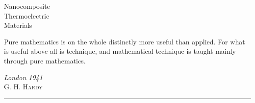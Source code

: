 \usepackage{tikz}	
\usepackage{epigraph}

\renewcommand\epigraphflush{flushright}

\makeatletter                       
\def\printauthor{%
    {\large \@author}}              
\makeatother
\author{
    Callum Vincent \\
    MPhys Student \\
    \texttt{cv235@exeter.ac.uk}\vspace{20pt} \\
    Prof. G. P. Srivastava \\
    Supervisor \\
    \texttt{gps@excc.ex.ac.uk}
    }


\begin{titlepage}
\setlength{}

\noindent
\titlefont Nanocomposite \\Thermoelectric \\Materials \par
\epigraph{Pure mathematics is on the whole distinctly more useful than applied. For what is useful above all is technique, and mathematical technique is taught mainly through pure mathematics.}%
{\textit{London 1941}\\ \textsc{G. H. Hardy}}
\null\vfill
\vspace*{1cm}
\noindent
\hfill

\begin{minipage}{0.35\linewidth}
    \begin{flushright}
        \printauthor
    \end{flushright}
\end{minipage}

\begin{minipage}{0.02\linewidth}
    \rule{1pt}{125pt}
\end{minipage}


\end{titlepage}
